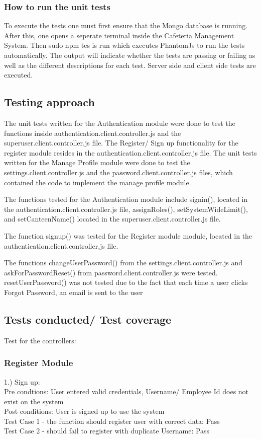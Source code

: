 \documentclass[a4paper,12pt]{article}
\begin{document}
\subsubsection{How to run the unit tests}
To execute the tests one must first ensure that the Mongo database is running. After this, one opens a seperate terminal inside the Cafeteria Management System. Then sudo npm tes is run which executes PhantomJs to run the tests automatically.  The output will indicate whether the tests are passing or failing as well as the different descriptions for each test. Server side and client side tests are executed.

\subsection{Testing approach}
The unit tests written for the Authentication module were done to test the functions inside authentication.client.controller.js and the superuser.client.controller.js file.  The Register/ Sign up functionality for the register module resides in the authentication.client.controller.js file. The unit tests written for the Manage Profile module were done to test the settings.client.controller.js and the password.client.controller.js files, which contained the code to implement the manage profile module.

The functions tested for the Authentication module include signin(), located in the authentication.client.controller.js file, assignRoles(), setSystemWideLimit(), and setCanteenName() located in the  superuser.client.controller.js file.

The function signup() was tested for the Register module module, located in the authentication.client.controller.js file.

The functions changeUserPassword() from the settings.client.controller.js and askForPasswordReset() from password.client.controller.js were tested. resetUserPassword() was not tested due to the fact that each time a user clicks Forgot Password, an email is sent to the user 
 
\subsection{Tests conducted/ Test coverage}
Test for the controllers:
\subsubsection{Register Module}
1.) Sign up: \\
Pre condtions: User entered valid credentials, Username/ Employee Id does not exist on the system
\\ Post conditions: User is signed up to use the system \\
Test Case 1 - the function should register user with correct data: Pass \\
Test Case 2 - should fail to register with duplicate Username: Pass
\end{document}
